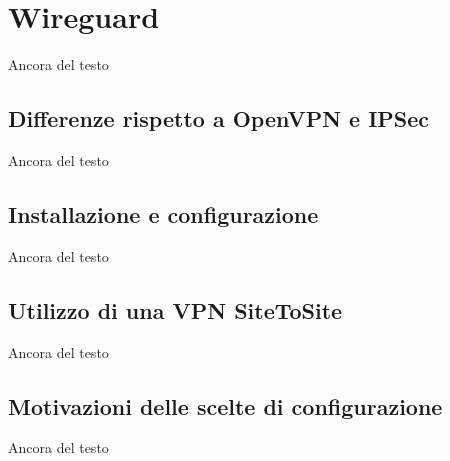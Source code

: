 \section{Wireguard}
Ancora del testo

\subsection{Differenze rispetto a OpenVPN e IPSec}
Ancora del testo

\subsection{Installazione e configurazione}
Ancora del testo

\subsection{Utilizzo di una VPN SiteToSite}
Ancora del testo

\subsection{Motivazioni delle scelte di configurazione}
Ancora del testo

